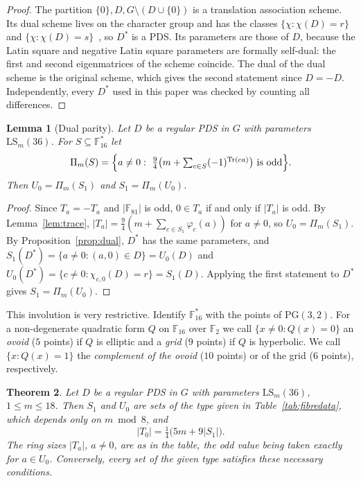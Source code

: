 \documentclass[11pt]{amsart}
\newtheorem{theorem}{Theorem}[section]
\newtheorem{lemma}[theorem]{Lemma}
\theoremstyle{definition}
\newcommand{\F}{\mathbb{F}}
\newcommand{\LS}{\mathrm{LS}}
\begin{document}
\begin{proof}
The partition $\{0\},D,G\setminus(D\cup\{0\})$ is a translation association scheme. Its dual scheme lives on the character group and has the classes $\{\chi:\chi(D)=r\}$ and $\{\chi:\chi(D)=s\}$~\cite{Delsarte1973}, so $D^*$ is a PDS. Its parameters are those of $D$, because the Latin square and negative Latin square parameters are formally self-dual: the first and second eigenmatrices of the scheme coincide. The dual of the dual scheme is the original scheme, which gives the second statement since $D=-D$. Independently, every $D^*$ used in this paper was checked by counting all differences.
\end{proof}

\begin{lemma}[Dual parity]\label{lem:parity}
Let $D$ be a regular PDS in $G$ with parameters $\LS_m(36)$. For $S\subseteq\F_{16}^*$ let
\[
\Pi_m(S)=\Bigl\{a\ne0:\ \tfrac94\bigl(m+\textstyle\sum_{c\in S}(-1)^{\mathrm{Tr}(ca)}\bigr)\ \text{is odd}\Bigr\}.
\]
Then $U_0=\Pi_m(S_1)$ and $S_1=\Pi_m(U_0)$.
\end{lemma}

\begin{proof}
Since $T_a=-T_a$ and $|\F_{81}|$ is odd, $0\in T_a$ if and only if $|T_a|$ is odd. By Lemma~\ref{lem:trace}, $|T_a|=\frac94(m+\sum_{c\in S_1}\varphi_c(a))$ for $a\ne0$, so $U_0=\Pi_m(S_1)$. By Proposition~\ref{prop:dual}, $D^*$ has the same parameters, and $S_1(D^*)=\{a\ne0:(a,0)\in D\}=U_0(D)$ and $U_0(D^*)=\{c\ne0:\chi_{c,0}(D)=r\}=S_1(D)$. Applying the first statement to $D^*$ gives $S_1=\Pi_m(U_0)$.
\end{proof}

This involution is very restrictive. Identify $\F_{16}^*$ with the points of $\mathrm{PG}(3,2)$. For a non-degenerate quadratic form $Q$ on $\F_{16}$ over $\F_2$ we call $\{x\ne0:Q(x)=0\}$ an \emph{ovoid} ($5$ points) if $Q$ is elliptic and a \emph{grid} ($9$ points) if $Q$ is hyperbolic. We call $\{x:Q(x)=1\}$ the \emph{complement of the ovoid} ($10$ points) or of the grid ($6$ points), respectively.

\begin{theorem}\label{thm:fibredata}
Let $D$ be a regular PDS in $G$ with parameters $\LS_m(36)$, $1\le m\le18$. Then $S_1$ and $U_0$ are sets of the type given in Table~\ref{tab:fibredata}, which depends only on $m\bmod 8$, and
\[
|T_0|=\tfrac14\bigl(5m+9|S_1|\bigr).
\]
The ring sizes $|T_a|$, $a\ne0$, are as in the table, the odd value being taken exactly for $a\in U_0$. Conversely, every set of the given type satisfies these necessary conditions.
\end{theorem}
\end{document}
